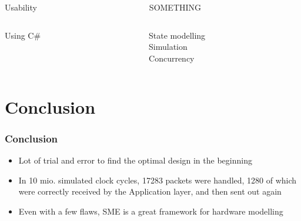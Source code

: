 \begin{frame}
\begin{columns}
\begin{column}{0.5\textwidth}
Usability

\end{column}

\begin{column}{0.5\textwidth}
SOMETHING
\end{column}
\end{columns}
\end{frame}

\begin{frame}
\begin{columns}
\begin{column}{0.5\textwidth}
Using C\#
\end{column}

\begin{column}{0.5\textwidth}
State modelling\\
Simulation\\
Concurrency
\end{column}
\end{columns}
\end{frame}

\section{Conclusion}
\begin{frame}
  \frametitle{Conclusion}

\begin{itemize}
\item Lot of trial and error to find the optimal design in the beginning
\item In 10 mio. simulated clock cycles, 17283 packets were handled,  1280 of
which were correctly received by the Application layer, and then sent out
again
\item Even with a few flaws, SME is a great framework for hardware modelling
\end{itemize}

\end{frame}
